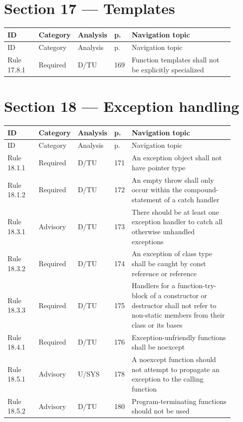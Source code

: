 \documentclass[10pt,letterpaper]{article}
\begin{document}
\section{Section 17 --- Templates}
\small\setlength{\tabcolsep}{3pt}\renewcommand{\arraystretch}{1.15}
\begin{longtable}{p{0.14\linewidth}p{0.14\linewidth}p{0.1\linewidth}p{0.045\linewidth}p{0.475\linewidth}}
\toprule
ID & Category & Analysis & p. & Navigation topic\\ \midrule
\endfirsthead
\toprule
ID & Category & Analysis & p. & Navigation topic\\ \midrule
\endhead
Rule 17.8.1 & Required & D/TU & 169 & Function templates shall not be explicitly specialized\\
\bottomrule
\end{longtable}
\normalsize

\section{Section 18 --- Exception handling}
\small\setlength{\tabcolsep}{3pt}\renewcommand{\arraystretch}{1.15}
\begin{longtable}{p{0.14\linewidth}p{0.14\linewidth}p{0.1\linewidth}p{0.045\linewidth}p{0.475\linewidth}}
\toprule
ID & Category & Analysis & p. & Navigation topic\\ \midrule
\endfirsthead
\toprule
ID & Category & Analysis & p. & Navigation topic\\ \midrule
\endhead
Rule 18.1.1 & Required & D/TU & 171 & An exception object shall not have pointer type\\
Rule 18.1.2 & Required & D/TU & 172 & An empty throw shall only occur within the compound-statement of a catch handler\\
Rule 18.3.1 & Advisory & D/TU & 173 & There should be at least one exception handler to catch all otherwise unhandled exceptions\\
Rule 18.3.2 & Required & D/TU & 174 & An exception of class type shall be caught by const reference or reference\\
Rule 18.3.3 & Required & D/TU & 175 & Handlers for a function-try-block of a constructor or destructor shall not refer to non-static members from their class or its bases\\
Rule 18.4.1 & Required & D/TU & 176 & Exception-unfriendly functions shall be noexcept\\
Rule 18.5.1 & Advisory & U/SYS & 178 & A noexcept function should not attempt to propagate an exception to the calling function\\
Rule 18.5.2 & Advisory & D/TU & 180 & Program-terminating functions should not be used\\
\bottomrule
\end{longtable}
\normalsize
\end{document}
